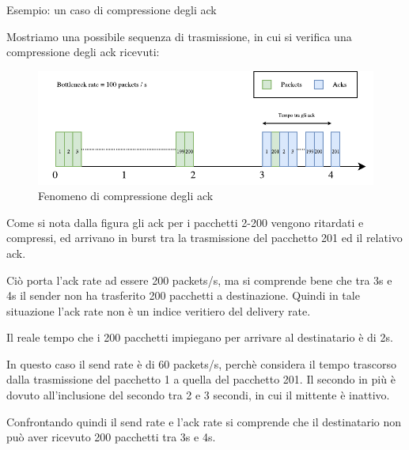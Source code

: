 \begin{esempio}{Esempio: un caso di compressione degli ack}

Mostriamo una possibile sequenza di trasmissione, in cui si verifica una compressione degli ack ricevuti:

\begin{figure}[H]

\center
\caption{Fenomeno di compressione degli ack}
\includegraphics[scale=0.9]{chapters/3_bbr/img/ack_rate_overstimate.pdf}

\end{figure}

Come si nota dalla figura gli ack per i pacchetti 2-200 vengono ritardati e compressi, ed arrivano in burst tra la trasmissione del pacchetto 201 ed il relativo ack. \bigskip

Ciò porta l'ack rate ad essere 200 packets/s, ma si comprende bene che tra 3s e 4s il sender non ha trasferito 200 pacchetti a destinazione. Quindi in tale situazione l'ack rate non è un indice veritiero del delivery rate. \bigskip

Il reale tempo che i 200 pacchetti impiegano per arrivare al destinatario è di 2s. \bigskip

In questo caso il send rate è di 60 packets/s, perchè considera il tempo trascorso dalla trasmissione del pacchetto 1 a quella del pacchetto 201. Il secondo in più è dovuto all'inclusione del secondo tra 2 e 3 secondi, in cui il mittente è inattivo. \bigskip

Confrontando quindi il send rate e l'ack rate si comprende che il destinatario non può aver ricevuto 200 pacchetti tra 3s e 4s.

\end{esempio}

